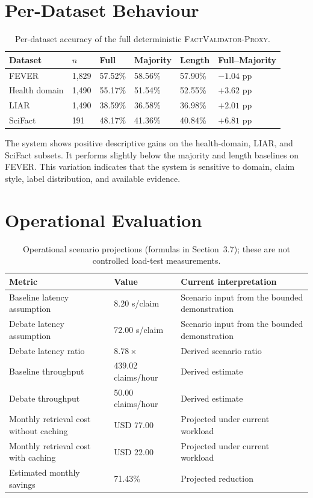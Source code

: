 \documentclass[12pt,a4paper,openany]{report}
\newcommand{\proxy}{\textsc{FactValidator-Proxy}}
\begin{document}
\section{Per-Dataset Behaviour}
\begin{table}[H]
\centering
\caption{Per-dataset accuracy of the full deterministic \proxy.}
\label{tab:perdataset}
\small
\begin{tabularx}{\textwidth}{Xp{1.4cm}p{1.6cm}p{1.6cm}p{1.9cm}X}
\toprule
Dataset & $n$ & Full & Majority & Length & Full--Majority \\
\midrule
FEVER & 1{,}829 & 57.52\% & 58.56\% & 57.90\% & $-1.04$ pp \\
Health domain & 1{,}490 & 55.17\% & 51.54\% & 52.55\% & $+3.62$ pp \\
LIAR & 1{,}490 & 38.59\% & 36.58\% & 36.98\% & $+2.01$ pp \\
SciFact & 191 & 48.17\% & 41.36\% & 40.84\% & $+6.81$ pp \\
\bottomrule
\end{tabularx}
\end{table}

The system shows positive descriptive gains on the health-domain, LIAR, and SciFact subsets. It performs slightly below the majority and length baselines on FEVER. This variation indicates that the system is sensitive to domain, claim style, label distribution, and available evidence.

\section{Operational Evaluation}
\begin{table}[H]
\centering
\caption{Operational scenario projections (formulas in Section~3.7); these are not controlled load-test measurements.}
\label{tab:operational}
\small
\begin{tabularx}{\textwidth}{p{5.5cm}p{2.6cm}X}
\toprule
Metric & Value & Current interpretation \\
\midrule
Baseline latency assumption & 8.20 s/claim & Scenario input from the bounded demonstration \\
Debate latency assumption & 72.00 s/claim & Scenario input from the bounded demonstration \\
Debate latency ratio & $8.78\times$ & Derived scenario ratio \\
Baseline throughput & 439.02 claims/hour & Derived estimate \\
Debate throughput & 50.00 claims/hour & Derived estimate \\
Monthly retrieval cost without caching & USD 77.00 & Projected under current workload \\
Monthly retrieval cost with caching & USD 22.00 & Projected under current workload \\
Estimated monthly savings & 71.43\% & Projected reduction \\
\bottomrule
\end{tabularx}
\end{table}
\end{document}
